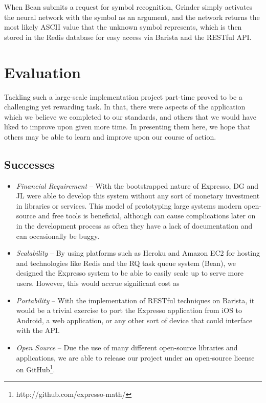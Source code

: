 \documentclass{acm_proc_article-sp}
\begin{document}
When Bean submits a request for symbol recognition, Grinder simply activates the neural network with the symbol as an argument, and the network returns the most likely ASCII value that the unknown symbol represents, which is then stored in the Redis database for easy access via Barista and the RESTful API.


\section{Evaluation}
Tackling such a large-scale implementation project part-time proved to be a challenging yet rewarding task. In that, there were aspects of the application which we believe we completed to our standards, and others that we would have liked to improve upon given more time. In presenting them here, we hope that others may be able to learn and improve upon our course of action.

\subsection{Successes}
\begin{itemize}
	\item{\emph{Financial Requirement}} -- With the bootstrapped nature of Expresso, DG and JL were able to develop this system without any sort of monetary investment in libraries or services. This model of prototyping large systems modern open-source and free tools is beneficial, although can cause complications later on in the development process as often they have a lack of documentation and can occasionally be buggy.
	\item{\emph{Scalability}} -- By using platforms such as Heroku and Amazon EC2 for hosting and technologies like Redis and the RQ task queue system (Bean), we designed the Expresso system to be able to easily scale up to serve more users. However, this would accrue significant cost as 
	\item{\emph{Portability}} -- With the implementation of RESTful techniques on Barista, it would be a trivial exercise to port the Expresso application from iOS to Android, a web application, or any other sort of device that could interface with the API.
	\item{\emph{Open Source}} -- Due the use of many different open-source libraries and applications, we are able to release our project under an open-source license on GitHub\footnote{http://github.com/expresso-math/}.

\end{itemize}
\end{document}
